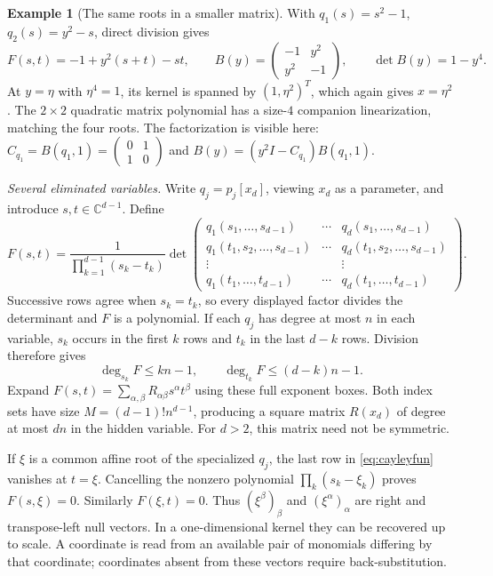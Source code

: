 \documentclass[12pt]{article}
\def\C{\mathbb{C}}
\theoremstyle{definition}
\newtheorem{example}[theorem]{Example}
\theoremstyle{remark}
\begin{document}
\begin{example}[The same roots in a smaller matrix]\label{ex:bezout-running}
  With $q_1(s)=s^2-1$, $q_2(s)=y^2-s$, direct division gives
  \[
    F(s,t)=-1+y^2(s+t)-st,\qquad
    B(y)=\begin{pmatrix}-1&y^2\\y^2&-1\end{pmatrix},\qquad
    \det B(y)=1-y^4.
  \]
  At $y=\eta$ with $\eta^4=1$, its kernel is spanned by $(1,\eta^2)^T$,
  which again gives $x=\eta^2$. The $2\times2$ quadratic matrix polynomial
  has a size-$4$ companion linearization, matching the four roots.
  The factorization is visible here: $C_{q_1}=B(q_1,1)=
  \left(\begin{smallmatrix}0&1\\1&0\end{smallmatrix}\right)$ and
  $B(y)=(y^2I-C_{q_1})B(q_1,1)$.
\end{example}

\emph{Several eliminated variables.} Write $q_j=p_j[x_d]$, viewing $x_d$
as a parameter, and introduce $s,t\in\C^{d-1}$. Define
\begin{equation}\label{eq:cayleyfun}
  F(s,t)=\frac{1}{\prod_{k=1}^{d-1}(s_k-t_k)}
  \det\begin{pmatrix}
    q_1(s_1,\ldots,s_{d-1})&\cdots&q_d(s_1,\ldots,s_{d-1})\\
    q_1(t_1,s_2,\ldots,s_{d-1})&\cdots&q_d(t_1,s_2,\ldots,s_{d-1})\\
    \vdots&&\vdots\\
    q_1(t_1,\ldots,t_{d-1})&\cdots&q_d(t_1,\ldots,t_{d-1})
  \end{pmatrix}.
\end{equation}
Successive rows agree when $s_k=t_k$, so every displayed factor divides
the determinant and $F$ is a polynomial. If each $q_j$ has degree at most
$n$ in each variable, $s_k$ occurs in the first $k$ rows and $t_k$ in the
last $d-k$ rows. Division therefore gives
\[
  \deg_{s_k}F\le kn-1,\qquad \deg_{t_k}F\le(d-k)n-1.
\]
Expand $F(s,t)=\sum_{\alpha,\beta}R_{\alpha\beta}s^\alpha t^\beta$ using
these full exponent boxes. Both index sets have size
$M=(d-1)!n^{d-1}$, producing a square matrix $R(x_d)$ of degree at most
$dn$ in the hidden variable. For $d>2$, this matrix need not be symmetric.

If $\xi$ is a common affine root of the specialized $q_j$, the last row in
\eqref{eq:cayleyfun} vanishes at $t=\xi$. Cancelling the nonzero polynomial
$\prod_k(s_k-\xi_k)$ proves $F(s,\xi)=0$. Similarly $F(\xi,t)=0$.
Thus $(\xi^\beta)_\beta$ and $(\xi^\alpha)_\alpha$ are right and transpose-left
null vectors. In a one-dimensional kernel they can be recovered up to scale.
A coordinate is read from an available pair of monomials differing by that
coordinate; coordinates absent from these vectors require back-substitution.
\end{document}

